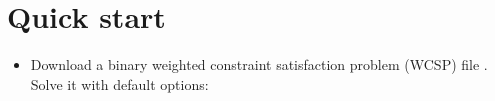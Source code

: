 \documentclass[letterpaper,10pt,openany,oneside,english]{sphinxmanual}
\begin{document}
\chapter{Quick start}
\label{\detokenize{userdoc:quick-start}}\begin{itemize}
\item {} 
\sphinxAtStartPar
Download a binary weighted constraint satisfaction problem (WCSP) file . Solve it with default options:

\begin{sphinxVerbatim}[commandchars=\\\{\}]
 
\end{sphinxVerbatim}


\end{itemize}
\end{document}
